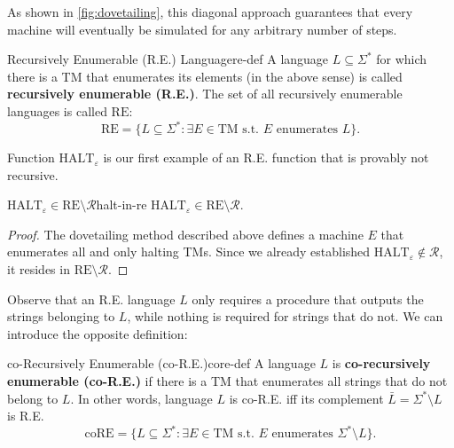 As shown in \cref{fig:dovetailing}, this diagonal approach guarantees that every machine will eventually be simulated for any arbitrary number of steps.

\begin{definition}{Recursively Enumerable (R.E.) Language}{re-def}
    A language \(L \subseteq \Sigma^*\) for which there is a TM that enumerates its elements (in the above sense) is called \textbf{recursively enumerable (R.E.)}. The set of all recursively enumerable languages is called \(\text{RE}\):
    \[
    \text{RE} = \{L \subseteq \Sigma^* : \exists E \in \text{TM s.t. } E \text{ enumerates } L\}.
    \]
\end{definition}

\noindent Function \(\text{HALT}_\varepsilon\) is our first example of an R.E. function that is provably not recursive.

\begin{theorem}{\(\text{HALT}_\varepsilon \in \text{RE} \setminus \mathcal{R}\)}{halt-in-re}
    \(\text{HALT}_\varepsilon \in \text{RE} \setminus \mathcal{R}\).
    \begin{proof}
        The dovetailing method described above defines a machine \(E\) that enumerates all and only halting TMs. Since we already established \(\text{HALT}_\varepsilon \notin \mathcal{R}\), it resides in \(\text{RE} \setminus \mathcal{R}\).
    \end{proof}
\end{theorem}

Observe that an R.E. language \(L\) only requires a procedure that outputs the strings belonging to \(L\), while nothing is required for strings that do not. We can introduce the opposite definition:

\begin{definition}{co-Recursively Enumerable (co-R.E.)}{core-def}
    A language \(L\) is \textbf{co-recursively enumerable (co-R.E.)} if there is a TM that enumerates all strings that do not belong to \(L\). In other words, language \(L\) is co-R.E. iff its complement \(\bar{L} = \Sigma^* \setminus L\) is R.E. 
    \[
    \text{coRE} = \{L \subseteq \Sigma^* : \exists E \in \text{TM s.t. } E \text{ enumerates } \Sigma^* \setminus L\}.
    \]
\end{definition}

